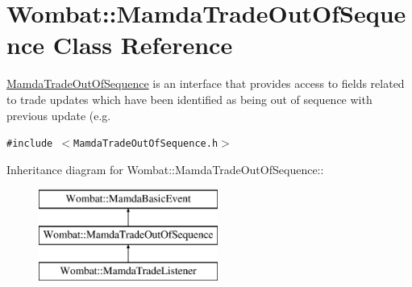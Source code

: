 \hypertarget{classWombat_1_1MamdaTradeOutOfSequence}{
\section{Wombat::Mamda\-Trade\-Out\-Of\-Sequence Class Reference}
\label{classWombat_1_1MamdaTradeOutOfSequence}
}
\hyperlink{classWombat_1_1MamdaTradeOutOfSequence}{Mamda\-Trade\-Out\-Of\-Sequence} is an interface that provides access to fields related to trade updates which have been identified as being out of sequence with previous update (e.g.  


{\tt \#include $<$Mamda\-Trade\-Out\-Of\-Sequence.h$>$}

Inheritance diagram for Wombat::Mamda\-Trade\-Out\-Of\-Sequence::\begin{figure}[H]
\begin{center}
\leavevmode
\includegraphics[height=3cm]{classWombat_1_1MamdaTradeOutOfSequence}
\end{center}
\end{figure}
